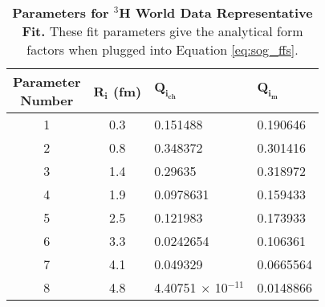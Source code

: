 \begin{table}[!h]
\centering
\begin{tabular}{|c c l l|}
\hline
\makecell{\textbf{Parameter}\\ \textbf{Number}} & \textbf{$\boldsymbol{R_i}$ (fm)} & \textbf{$\boldsymbol{Q_{i_{ch}}}$} & \textbf{$\boldsymbol{Q_{i_{m}}}$}\\
\hline
1 & 0.3 & 0.151488 & 0.190646 \\
2 & 0.8 & 0.348372 & 0.301416 \\
3 & 1.4 & 0.29635 & 0.318972 \\
4 & 1.9 & 0.0978631 & 0.159433 \\
5 & 2.5 & 0.121983 & 0.173933 \\
6 & 3.3 & 0.0242654 & 0.106361 \\
7 & 4.1 & 0.049329 & 0.0665564 \\
8 & 4.8 & 4.40751 $\times$ 10$^{-11}$ & 0.0148866 \\          
\hline
\end{tabular}
\caption[Parameters for $^3$H World Data Representative Fit]{{\bf{Parameters for $^3$H World Data Representative Fit.}} These fit parameters give the analytical form factors when plugged into Equation \ref{eq:sog_ffs}.}
\label{tab:3h_rep_fit_pars}
\end{table}


